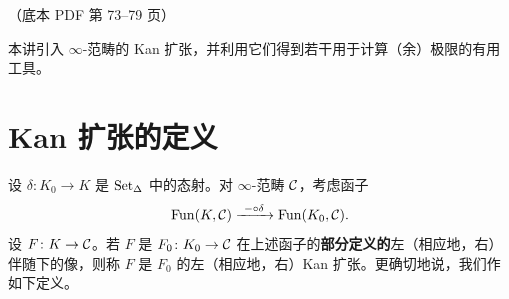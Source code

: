 \begin{center}\small\color{black!55}（底本 PDF 第 73–79 页）\end{center}

本讲引入 $\infty$-范畴的 Kan 扩张，并利用它们得到若干用于计算（余）极限的有用工具。

\section{Kan 扩张的定义}

\nitem\label{L9-1.1} 设 $\delta\colon K_0\to K$ 是 $\operatorname{Set}_\Delta$ 中的态射。对 $\infty$-范畴 $\mathcal{C}$，考虑函子
\[
\Fun(K,\cC)\xrightarrow{\ -\circ\delta\ }\Fun(K_0,\cC).
\]
设 $F\colon K\to\mathcal{C}$。若 $F$ 是 $F_0\colon K_0\to\mathcal{C}$ 在上述函子的\textbf{部分定义的}左（相应地，右）伴随下的像，则称 $F$ 是 $F_0$ 的左（相应地，右）Kan 扩张。更确切地说，我们作如下定义。


